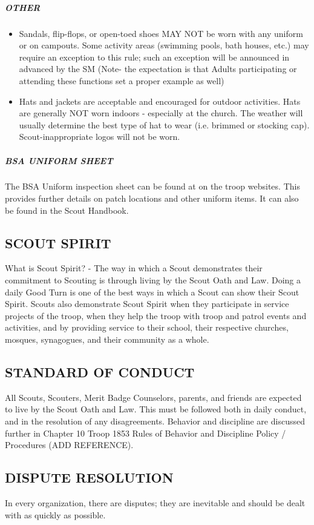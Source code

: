 \documentclass{ltxguide}
\begin{document}
\subparagraph{OTHER}
\begin{itemize}
	\item Sandals, flip-flops, or open-toed shoes MAY NOT be worn with any uniform or on campouts. Some activity areas (swimming pools, bath houses, etc.) may require an exception to this rule; such an exception will be announced in advanced by the \ac{SM} (Note- the expectation is that Adults participating or attending these functions set a proper example as well)
	\item Hats and jackets are acceptable and encouraged for outdoor activities. Hats are generally NOT worn indoors - especially at the church. The weather will usually determine the best type of hat to wear (i.e. brimmed or stocking cap). Scout-inappropriate logos will not be worn.
\end{itemize}

\subparagraph{\ac{BSA} UNIFORM SHEET}
The \ac{BSA} Uniform inspection sheet can be found at on the troop websites. This provides further details on patch  locations and other uniform items. It can also be found in the Scout Handbook.

\subsection{SCOUT SPIRIT}
What is Scout Spirit? - The way in which a Scout demonstrates their commitment to Scouting is through living by the Scout Oath and Law. Doing a daily Good Turn is one of the best ways in which a Scout can show their Scout Spirit. Scouts also demonstrate Scout Spirit when they participate in service projects of the troop, when they help the troop with troop and patrol events and activities, and by providing service to their school, their respective churches, mosques, synagogues, and their community as a whole.

\subsection{STANDARD OF CONDUCT}
All Scouts, Scouters, Merit Badge Counselors, parents, and friends are expected to live by the Scout Oath and Law. This must be followed both in daily conduct, and in the resolution of any disagreements. Behavior and discipline are discussed further in Chapter 10 Troop 1853 Rules of Behavior and Discipline Policy / Procedures (ADD REFERENCE).

\subsection{DISPUTE RESOLUTION}
In every organization, there are disputes; they are inevitable and should be dealt with as quickly as possible.
\end{document}
